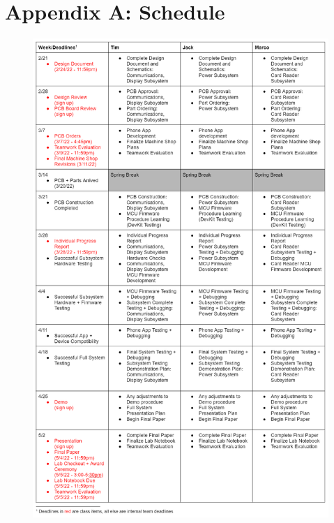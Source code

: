 \documentclass[12pt]{article}
\begin{document}
\newpage
\section{Appendix A: Schedule}
\begin{figure}[!h]
	\centering
	\includegraphics[height=0.93\textheight]{Schedule.png}
\end{figure}
\end{document}
